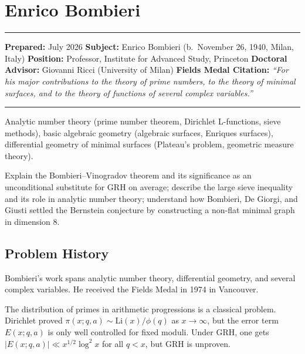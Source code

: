 \chapter{Enrico Bombieri}\label{ch1974enricobombieri:enrico-bombieri-fields-medal-1974-a-comprehensive-report-on-his-work-and-impact}

\begin{center}\rule{0.5\linewidth}{0.5pt}\end{center}

\textbf{Prepared:} July 2026 \textbf{Subject:} Enrico Bombieri (b.\
November 26, 1940, Milan, Italy) \textbf{Position:} Professor,
Institute for Advanced Study, Princeton \textbf{Doctoral Advisor:}
Giovanni Ricci (University of Milan) \textbf{Fields Medal Citation:}
\emph{``For his major contributions to the theory of prime numbers, to
the theory of minimal surfaces, and to the theory of functions of several
complex variables.''}

\begin{center}\rule{0.5\linewidth}{0.5pt}\end{center}

\begin{prereqs} Analytic number theory (prime number theorem, Dirichlet
L-functions, sieve methods), basic algebraic geometry (algebraic
surfaces, Enriques surfaces), differential geometry of minimal surfaces
(Plateau's problem, geometric measure theory). \end{prereqs}

\begin{objectives} Explain the Bombieri--Vinogradov theorem and its
significance as an unconditional substitute for GRH on average; describe
the large sieve inequality and its role in analytic number theory;
understand how Bombieri, De Giorgi, and Giusti settled the Bernstein
conjecture by constructing a non-flat minimal graph in dimension 8.
\end{objectives}

\section{Problem History}

Bombieri's work spans analytic number theory, differential geometry, and
several complex variables. He received the Fields Medal in 1974 in
Vancouver.

The distribution of primes in arithmetic progressions is a classical
problem. Dirichlet proved $\pi(x; q, a) \sim \mathrm{Li}(x) / \phi(q)$
as $x \to \infty$, but the error term $E(x; q, a)$ is only well
controlled for fixed moduli. Under GRH, one gets
$|E(x; q, a)| \ll x^{1/2} \log^2 x$ for all $q < x$, but GRH is
unproven.

